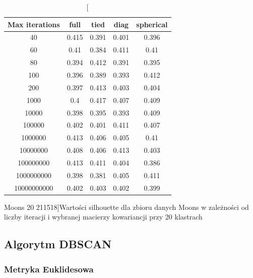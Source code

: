 \documentclass{classrep}
\begin{document}
{{\begin{table}[!htbp]
                \begin{minipage}{1\textwidth}
                \centering
                \begin{tabular}{|c|c|c|c|c|}
                \hline
                Max iterations & full & tied & diag & spherical \\ \hline
                40 & 0.415 & 0.391 & 0.401 & 0.396 \\ \hline
                60 & 0.41 & 0.384 & 0.411 & 0.41 \\ \hline
                80 & 0.394 & 0.412 & 0.391 & 0.395 \\ \hline
                100 & 0.396 & 0.389 & 0.393 & 0.412 \\ \hline
                200 & 0.397 & 0.413 & 0.403 & 0.404 \\ \hline
                1000 & 0.4 & 0.417 & 0.407 & 0.409 \\ \hline
                10000 & 0.398 & 0.395 & 0.393 & 0.409 \\ \hline
                100000 & 0.402 & 0.401 & 0.411 & 0.407 \\ \hline
                1000000 & 0.413 & 0.406 & 0.405 & 0.41 \\ \hline
                10000000 & 0.408 & 0.406 & 0.413 & 0.403 \\ \hline
                100000000 & 0.413 & 0.411 & 0.404 & 0.386 \\ \hline
                1000000000 & 0.398 & 0.381 & 0.405 & 0.411 \\ \hline
                10000000000 & 0.402 & 0.403 & 0.402 & 0.399 \\ \hline
                \end{tabular}
                \caption
                [Moons 20 211518]{Wartości silhouette dla zbioru danych Moons w
                zależności od liczby iteracji i wybranej macierzy kowariancji przy 20
                klastrach}
                \label{Moons_20_211518}
                \end{minipage}
                \hfill
            \end{table}
        }
        \newpage

        \subsection{Algorytm DBSCAN}
        \label{result_4} {

            \subsubsection{Metryka Euklidesowa}
            \label{dbscan_eucl} {

}}}
\end{document}
